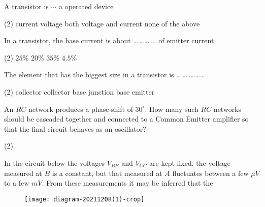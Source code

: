 \begin{enumerate}
	\begin{minipage}{\textwidth}
		\item  A transistor is $\cdots$ a operated device
	\end{minipage}
	\begin{tasks}(2)
		\task[\textbf{A.}] current
		\task[\textbf{B.}] voltage
		\task[\textbf{C.}]both voltage and current
		\task[\textbf{D.}]none of the above
	\end{tasks}
\begin{minipage}{\textwidth}
	\item In a transistor, the base current is about ………….. of emitter current
\end{minipage}
\begin{tasks}(2)
	\task[\textbf{A.}] $25 \%$
	\task[\textbf{B.}] $20 \%$
	\task[\textbf{C.}] $35 \%$
	\task[\textbf{D.}]$4.5 \%$ 
\end{tasks}
\begin{minipage}{\textwidth}
	\item The element that has the biggest size in a transistor is ………………..
\end{minipage}
\begin{tasks}(2)
	\task[\textbf{A.}] collector
	\task[\textbf{B.}] collector base junction
	\task[\textbf{C.}]base
	\task[\textbf{D.}]emitter
\end{tasks}
	 \begin{minipage}{\textwidth}
		\item An $R C$ network produces a phase-shift of $30^{\circ} .$ How many such $R C$ networks should be cascaded together and connected to a Common Emitter amplifier so that the final circuit behaves as an oscillator?
	\end{minipage}
	\begin{tasks}(2)
	\end{tasks}
\begin{minipage}{\textwidth}
	\item In the circuit below the voltages $V_{B B}$ and $V_{C C}$ are kept fixed, the voltage measured at $B$ is a constant, but that measured at $A$ fluctuates between a few $\mu V$ to a few $m V$.
	From these measurements it may be inferred that the\\
\begin{figure}[H]
	\centering
	\texttt{[image: diagram-20211208(1)-crop]}
\end{figure}

\end{minipage}
\end{enumerate}
